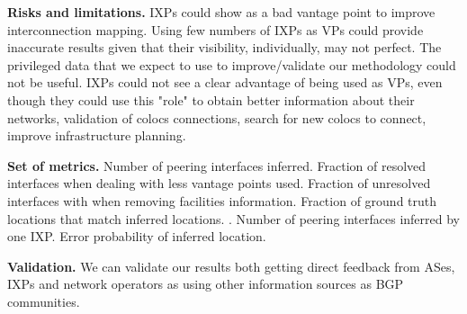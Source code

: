 	\textbf{Risks and limitations.} IXPs could show as a bad vantage point to improve interconnection mapping. Using few numbers of IXPs as VPs could provide inaccurate results given that their visibility, individually, may not perfect. The privileged data that we expect to use to improve/validate our methodology could not be useful. IXPs could not see a clear advantage of being used as VPs, even though they could use this "role" to obtain better information about their networks, validation of colocs connections, search for new colocs to connect, improve infrastructure planning.

	\textbf{Set of metrics.} Number of peering interfaces inferred. Fraction of resolved interfaces when dealing with less vantage points used. Fraction of unresolved interfaces with when removing facilities information. Fraction of ground truth locations that match inferred locations. \cite{Giotsas:2015:MPI:2716281.2836122}. Number of peering interfaces inferred by one IXP. Error probability of inferred location.

	\textbf{Validation.} We can validate our results both getting direct feedback from ASes, IXPs and network operators as using other information sources as BGP communities.
